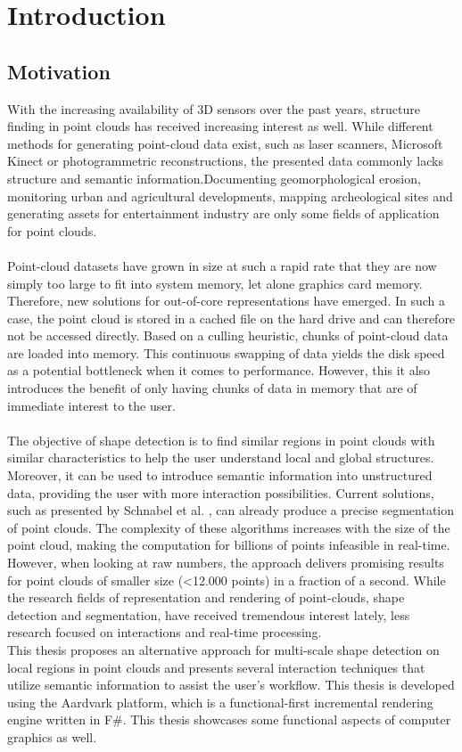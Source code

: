 \chapter{Introduction}
\section{Motivation}

With the increasing availability of 3D sensors over the past years, structure finding in point clouds has received increasing interest as well. While different methods for generating point-cloud data exist, such as laser scanners, Microsoft Kinect or photogrammetric reconstructions, the presented data commonly lacks structure and semantic information.Documenting geomorphological erosion, monitoring urban and agricultural developments, mapping archeological sites and generating assets for entertainment industry are only some fields of application for point clouds. 
\\
\\
Point-cloud datasets have grown in size at such a rapid rate that they are now simply too large to fit into system memory, let alone graphics card memory. Therefore, new solutions for out-of-core representations have emerged. In such a case, the point cloud is stored in a cached file on the hard drive and can therefore not be accessed directly. Based on a culling heuristic, chunks of point-cloud data are loaded into memory. This continuous swapping of data yields the disk speed as a potential bottleneck when it comes to performance. However, this it also introduces the benefit of only having chunks of data in memory that are of immediate interest to the user. 
\\
\\
The objective of shape detection is to find similar regions in point clouds with similar characteristics to help the user understand local and global structures. Moreover, it can be used to introduce semantic information into unstructured data, providing the user with more interaction possibilities. Current solutions, such as presented by Schnabel et al. \cite{schnabel-2007-efficient, schnabel-2007-ransac}, can already produce a precise segmentation of point clouds. The complexity of these algorithms increases with the size of the point cloud, making the computation for billions of points infeasible in real-time. However, when looking at raw numbers, the approach delivers promising results for point clouds of smaller size (<12.000 points) in a fraction of a second.
While the research fields of representation and rendering of point-clouds, shape detection and segmentation, have received tremendous interest lately, less research focused on interactions and real-time processing. 
\\
This thesis proposes an alternative approach for multi-scale shape detection on local regions in point clouds and presents several interaction techniques that utilize semantic information to assist the user's workflow. This thesis is developed using the Aardvark platform, which is a functional-first incremental rendering engine written in F\#. This thesis showcases some functional aspects of computer graphics as well. 



